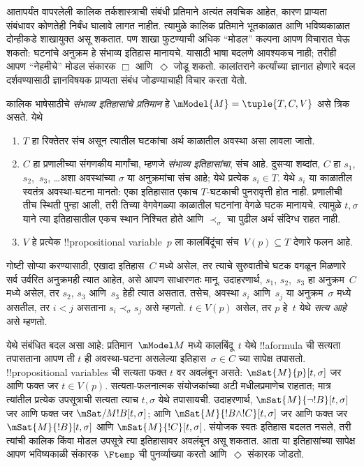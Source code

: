 \documentclass[../../../include/open-logic-section]{subfiles}
\begin{document}


आतापर्यंत वापरलेली कालिक तर्कशास्त्राची संबंधी
प्रतिमाने अत्यंत लवचिक आहेत, कारण प्राप्यता संबंधावर
कोणतेही निर्बंध घालावे लागत नाहीत. त्यामुळे कालिक
प्रतिमाने भूतकाळात आणि भविष्यकाळात दोन्हीकडे
शाखायुक्त असू शकतात. पण शाखा फुटण्याची अधिक
``मोडल'' कल्पना आपण विचारात घेऊ शकतो: घटनांचे
अनुक्रम हे संभाव्य इतिहास मानायचे. यासाठी भाषा
बदलणे आवश्यकच नाही; तरीही आपण ``नेहमीचे''
मोडल संकारक $\Box$ आणि~$\Diamond$ जोडू शकतो.
कालांतराने कर्त्यांच्या ज्ञानात होणारे बदल दर्शवण्यासाठी
ज्ञानविषयक प्राप्यता संबंध जोडण्याचाही विचार करता येतो.

\begin{defn}
  कालिक भाषेसाठीचे \emph{संभाव्य इतिहासांचे प्रतिमान}
  हे $\mModel{M} = \tuple{T, C, V}$ असे त्रिक असते. येथे
  \begin{enumerate}
    \item $T$ हा रिक्तेतर संच असून त्यातील घटकांचा अर्थ
      काळातील अवस्था असा लावला जातो.
    \item $C$ हा प्रणालीच्या संगणकीय मार्गांचा, म्हणजे
      \emph{संभाव्य इतिहासांचा}, संच आहे. दुसऱ्या शब्दांत,
      $C$ हा $s_1$, $s_2$,~$s_3$, \dots अशा अवस्थांच्या
      $\sigma$ या अनुक्रमांचा संच आहे; येथे
      प्रत्येक $s_i \in T$. येथे $s_i$ या काळातील स्वतंत्र
      अवस्था-घटना मानतो: एका इतिहासात एकाच $T$-घटकाची
      पुनरावृत्ती होत नाही. प्रणालीची तीच स्थिती पुन्हा आली,
      तरी तिच्या वेगवेगळ्या काळातील घटनांना वेगळे घटक मानायचे.
      त्यामुळे $t,\sigma$ याने त्या इतिहासातील एकच स्थान
      निश्चित होते आणि $\prec_\sigma$ चा पुढील अर्थ संदिग्ध राहत नाही.
    \item $V$ हे प्रत्येक !!{propositional
      variable}~$p$ ला कालबिंदूंचा संच~$V(p) \subseteq T$ देणारे फलन आहे.
  \end{enumerate}
  गोष्टी सोप्या करण्यासाठी, एखादा इतिहास~$C$ मध्ये
  असेल, तर त्याचे सुरुवातीचे घटक वगळून मिळणारे
  सर्व उर्वरित अनुक्रमही त्यात आहेत, असे आपण साधारणतः
  मानू. उदाहरणार्थ, $s_1$, $s_2$,~$s_3$ हा अनुक्रम~$C$
  मध्ये असेल, तर $s_2$, $s_3$ आणि~$s_3$ हेही त्यात
  असतात. तसेच, अवस्था $s_i$ आणि~$s_j$ या
  अनुक्रम~$\sigma$ मध्ये असतील, तर $i < j$ असताना
  $s_i \prec_\sigma s_j$ असे म्हणतो.
  $t \in V(p)$ असेल, तर $p$ हे~$t$ येथे
  \emph{सत्य आहे} असे म्हणतो.
\end{defn}

येथे संबंधित बदल असा आहे: प्रतिमान~$\mModel M$
मध्ये कालबिंदू~$t$ येथे !!a{formula} ची सत्यता
तपासताना आपण ती $t$ ही अवस्था-घटना असलेल्या
इतिहास~$\sigma \in C$ च्या सापेक्ष तपासतो.
!!{propositional variable}s ची सत्यता फक्त $t$ वर अवलंबून असते:
$\mSat{M}{p}[t,\sigma]$ जर आणि फक्त जर $t\in V(p)$.
सत्यता-फलनात्मक संयोजकांच्या अटी
 मधीलप्रमाणेच राहतात;
मात्र त्यांतील प्रत्येक उपसूत्राची सत्यता त्याच
$t,\sigma$ येथे तपासायची. उदाहरणार्थ,
$\mSat{M}{\lnot !B}[t,\sigma]$ जर आणि फक्त जर
$\mSat/{M}{!B}[t,\sigma]$; आणि
$\mSat{M}{!B\land !C}[t,\sigma]$ जर आणि फक्त जर
$\mSat{M}{!B}[t,\sigma]$ आणि $\mSat{M}{!C}[t,\sigma]$.
संयोजक स्वतः इतिहास बदलत नसले, तरी त्यांची कालिक किंवा
मोडल उपसूत्रे त्या इतिहासावर अवलंबून असू शकतात.
आता या इतिहासांच्या सापेक्ष आपण
भविष्यकाळी संकारक~$\Ftemp$ ची पुनर्व्याख्या करतो
आणि~$\Diamond$ संकारक जोडतो.
\end{document}
